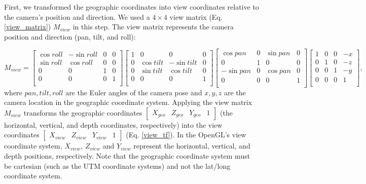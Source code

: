\documentclass{article}
\begin{document}
First, we transformed the geographic coordinates into view coordinates relative to the camera's position and direction. We used a \(4 \times 4\) view matrix (Eq. \ref{view_matrix}) \(M_{view}\) in this step. The view matrix represents the camera position and direction (pan, tilt, and roll):

\begin{equation}
\label{view_matrix}
  M_{view} = 
  \begin{bmatrix}
    \cos roll & -\sin roll & 0 & 0 \\
    \sin roll & \cos roll & 0 & 0 \\
    0 & 0 & 1 & 0 \\
    0 & 0 & 0 & 1 \\
  \end{bmatrix}
  \begin{bmatrix}
    1 & 0 & 0 & 0 \\
    0 & \cos tilt & -\sin tilt & 0 \\
    0 & \sin tilt & \cos tilt & 0 \\
    0 & 0 & 0 & 1 \\
  \end{bmatrix}
  \begin{bmatrix}
    \cos pan & 0 & \sin pan & 0 \\
    0 & 1 & 0 & 0 \\
    -\sin pan & 0 & \cos pan & 0 \\
    0 & 0 & 0 & 1 \\
  \end{bmatrix}
  \begin{bmatrix}
    1 & 0 & 0 & -x \\
    0 & 1 & 0 & -z \\
    0 & 0 & 1 & -y \\
    0& 0 & 0 & 1 \\
  \end{bmatrix},
\end{equation}
where \(pan, tilt, roll\) are the Euler angles of the camera pose and \(x, y, z\) are the camera location in the geographic coordinate system. Applying the view matrix \(M_{view}\) transforms the geographic coordinates \(\begin{bmatrix} X_{geo} & Z_{geo} & Y_{geo} & 1 \end{bmatrix}\) (the horizontal, vertical, and depth coordinates, respectively) into the view coordinates \(\begin{bmatrix} X_{view} & Z_{view} & Y_{view} & 1 \end{bmatrix}\) (Eq. \ref{view_tf}). In the OpenGL's view coordinate system, \(X_{view}\), \(Z_{view}\) and \(Y_{view}\) represent the horizontal, vertical, and depth positions, respectively. Note that the geographic coordinate system must be cartesian (such as the UTM coordinate systems) and not the lat/long coordinate system.
\end{document}
